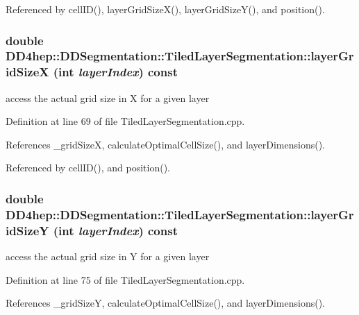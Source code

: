 Referenced by cellID(), layerGridSizeX(), layerGridSizeY(), and position().\hypertarget{class_d_d4hep_1_1_d_d_segmentation_1_1_tiled_layer_segmentation_a4e1ba517985d9b161705c9defef89640}{
\subsubsection[{layerGridSizeX}]{\setlength{\rightskip}{0pt plus 5cm}double DD4hep::DDSegmentation::TiledLayerSegmentation::layerGridSizeX (int {\em layerIndex}) const}}
\label{class_d_d4hep_1_1_d_d_segmentation_1_1_tiled_layer_segmentation_a4e1ba517985d9b161705c9defef89640}


access the actual grid size in X for a given layer 

Definition at line 69 of file TiledLayerSegmentation.cpp.

References \_\-gridSizeX, calculateOptimalCellSize(), and layerDimensions().

Referenced by cellID(), and position().\hypertarget{class_d_d4hep_1_1_d_d_segmentation_1_1_tiled_layer_segmentation_ae7faae312b547313ca0e139bc8973149}{
\subsubsection[{layerGridSizeY}]{\setlength{\rightskip}{0pt plus 5cm}double DD4hep::DDSegmentation::TiledLayerSegmentation::layerGridSizeY (int {\em layerIndex}) const}}
\label{class_d_d4hep_1_1_d_d_segmentation_1_1_tiled_layer_segmentation_ae7faae312b547313ca0e139bc8973149}


access the actual grid size in Y for a given layer 

Definition at line 75 of file TiledLayerSegmentation.cpp.

References \_\-gridSizeY, calculateOptimalCellSize(), and layerDimensions().

